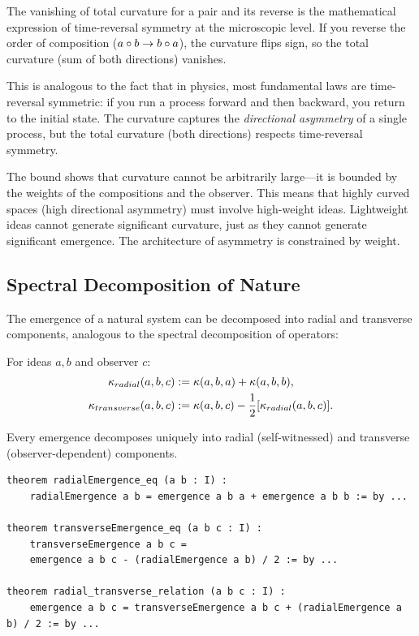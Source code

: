 \begin{interpretation}
The vanishing of total curvature for a pair and its reverse is the mathematical
expression of time-reversal symmetry at the microscopic level. If you reverse
the order of composition ($a \circ b \to b \circ a$), the curvature flips
sign, so the total curvature (sum of both directions) vanishes.

This is analogous to the fact that in physics, most fundamental laws are
time-reversal symmetric: if you run a process forward and then backward, you
return to the initial state. The curvature captures the \emph{directional
asymmetry} of a single process, but the total curvature (both directions)
respects time-reversal symmetry.

The bound shows that curvature cannot be arbitrarily large---it is bounded by
the weights of the compositions and the observer. This means that highly curved
spaces (high directional asymmetry) must involve high-weight ideas. Lightweight
ideas cannot generate significant curvature, just as they cannot generate
significant emergence. The architecture of asymmetry is constrained by weight.
\end{interpretation}

\subsection{Spectral Decomposition of Nature}

The emergence of a natural system can be decomposed into radial and transverse
components, analogous to the spectral decomposition of operators:

\begin{definition}
\label{def:radial-transverse}
For ideas $a, b$ and observer $c$:
\begin{align*}
  \kappa_{radial}(a, b, c) &:= \kappa(a, b, a) + \kappa(a, b, b), \\
  \kappa_{transverse}(a, b, c) &:= \kappa(a, b, c) - \frac{1}{2}[\kappa_{radial}(a,b,c)].
\end{align*}
\end{definition}

\begin{theorem}
\label{thm:radial-transverse}
Every emergence decomposes uniquely into radial (self-witnessed) and transverse
(observer-dependent) components.
\end{theorem}

\begin{lstlisting}[caption={Radial and transverse emergence (IDT\_v3\_Emergence.lean)}]
theorem radialEmergence_eq (a b : I) :
    radialEmergence a b = emergence a b a + emergence a b b := by ...
    
theorem transverseEmergence_eq (a b c : I) :
    transverseEmergence a b c =
    emergence a b c - (radialEmergence a b) / 2 := by ...
    
theorem radial_transverse_relation (a b c : I) :
    emergence a b c = transverseEmergence a b c + (radialEmergence a b) / 2 := by ...
\end{lstlisting}

